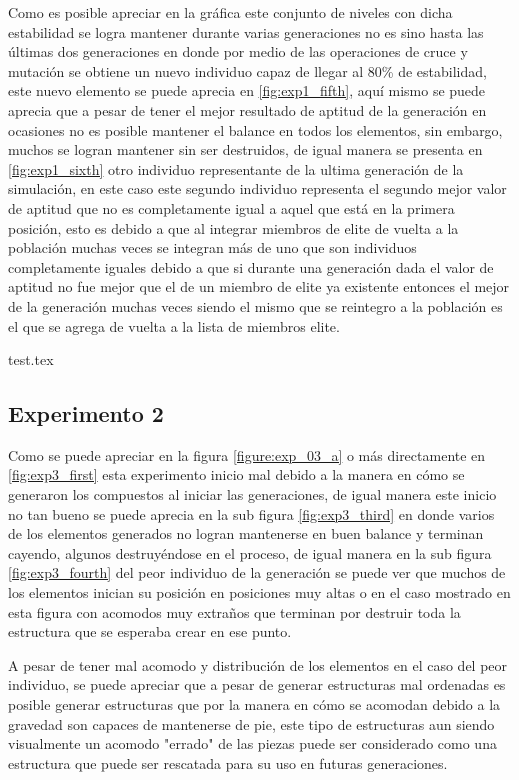Como es posible apreciar en la gráfica este conjunto de niveles con dicha
estabilidad se logra mantener durante varias generaciones no es sino hasta las
últimas dos generaciones en donde por medio de las operaciones de cruce y
mutación se obtiene un nuevo individuo capaz de llegar al 80\% de estabilidad,
este nuevo elemento se puede aprecia en \ref{fig:exp1_fifth}, aquí
mismo se puede aprecia que a pesar de tener el mejor resultado de aptitud de
la generación en ocasiones no es posible mantener el balance en todos los
elementos, sin embargo, muchos se logran mantener sin ser destruidos, de igual
manera se presenta en \ref{fig:exp1_sixth} otro individuo representante de la
ultima generación de la simulación, en este caso este segundo individuo
representa el segundo mejor valor de aptitud que no es completamente igual a
aquel que está en la primera posición, esto es debido a que al integrar miembros
de elite de vuelta a la población muchas veces se integran más de uno que son
individuos completamente iguales debido a que si durante una generación dada el
valor de aptitud no fue mejor que el de un miembro de elite ya existente
entonces el mejor de la generación muchas veces siendo el mismo que se reintegro
a la población es el que se agrega de vuelta a la lista de miembros elite.

{test.tex} 

\newpage

\subsection{Experimento 2}
\label{chap6:exp_2}

Como se puede apreciar en la figura \ref{figure:exp_03_a} o más directamente en
\ref{fig:exp3_first} esta experimento inicio mal debido a la manera en cómo se
generaron los compuestos al iniciar las generaciones, de igual manera este inicio
no tan bueno se puede aprecia en la sub figura \ref{fig:exp3_third} en donde
varios de los elementos generados no logran mantenerse en buen balance y terminan
cayendo, algunos destruyéndose en el proceso, de igual manera en la sub figura
\ref{fig:exp3_fourth} del peor individuo de la generación se puede ver que
muchos de los elementos inician su posición en posiciones muy altas o en el caso
mostrado en esta figura con acomodos muy extraños que terminan por destruir toda
la estructura que se esperaba crear en ese punto.

A pesar de tener mal acomodo y distribución de los elementos en el caso del peor
individuo, se puede apreciar que a pesar de generar estructuras mal ordenadas es
posible generar estructuras que por la manera en cómo se acomodan debido a la
gravedad son capaces de mantenerse de pie, este tipo de estructuras aun siendo
visualmente un acomodo "errado" de las piezas puede ser considerado como una
estructura que puede ser rescatada para su uso en futuras generaciones.

